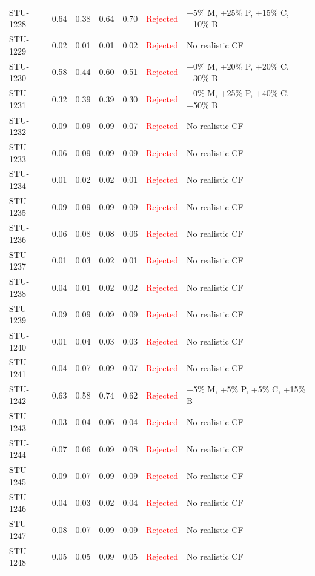 \begin{longtable}{l c c c c | c | l}
STU-1228 & 0.64 & 0.38 & 0.64 & 0.70 & \textcolor{red}{Rejected} & +5\% M, +25\% P, +15\% C, +10\% B \\
STU-1229 & 0.02 & 0.01 & 0.01 & 0.02 & \textcolor{red}{Rejected} & No realistic CF \\
STU-1230 & 0.58 & 0.44 & 0.60 & 0.51 & \textcolor{red}{Rejected} & +0\% M, +20\% P, +20\% C, +30\% B \\
STU-1231 & 0.32 & 0.39 & 0.39 & 0.30 & \textcolor{red}{Rejected} & +0\% M, +25\% P, +40\% C, +50\% B \\
STU-1232 & 0.09 & 0.09 & 0.09 & 0.07 & \textcolor{red}{Rejected} & No realistic CF \\
STU-1233 & 0.06 & 0.09 & 0.09 & 0.09 & \textcolor{red}{Rejected} & No realistic CF \\
STU-1234 & 0.01 & 0.02 & 0.02 & 0.01 & \textcolor{red}{Rejected} & No realistic CF \\
STU-1235 & 0.09 & 0.09 & 0.09 & 0.09 & \textcolor{red}{Rejected} & No realistic CF \\
STU-1236 & 0.06 & 0.08 & 0.08 & 0.06 & \textcolor{red}{Rejected} & No realistic CF \\
STU-1237 & 0.01 & 0.03 & 0.02 & 0.01 & \textcolor{red}{Rejected} & No realistic CF \\
STU-1238 & 0.04 & 0.01 & 0.02 & 0.02 & \textcolor{red}{Rejected} & No realistic CF \\
STU-1239 & 0.09 & 0.09 & 0.09 & 0.09 & \textcolor{red}{Rejected} & No realistic CF \\
STU-1240 & 0.01 & 0.04 & 0.03 & 0.03 & \textcolor{red}{Rejected} & No realistic CF \\
STU-1241 & 0.04 & 0.07 & 0.09 & 0.07 & \textcolor{red}{Rejected} & No realistic CF \\
STU-1242 & 0.63 & 0.58 & 0.74 & 0.62 & \textcolor{red}{Rejected} & +5\% M, +5\% P, +5\% C, +15\% B \\
STU-1243 & 0.03 & 0.04 & 0.06 & 0.04 & \textcolor{red}{Rejected} & No realistic CF \\
STU-1244 & 0.07 & 0.06 & 0.09 & 0.08 & \textcolor{red}{Rejected} & No realistic CF \\
STU-1245 & 0.09 & 0.07 & 0.09 & 0.09 & \textcolor{red}{Rejected} & No realistic CF \\
STU-1246 & 0.04 & 0.03 & 0.02 & 0.04 & \textcolor{red}{Rejected} & No realistic CF \\
STU-1247 & 0.08 & 0.07 & 0.09 & 0.09 & \textcolor{red}{Rejected} & No realistic CF \\
STU-1248 & 0.05 & 0.05 & 0.09 & 0.05 & \textcolor{red}{Rejected} & No realistic CF \\

\end{longtable}
